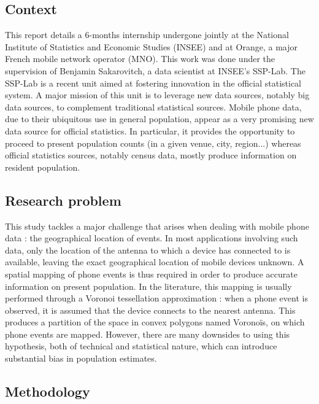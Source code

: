 

\subsection*{Context}

This report details a 6-months internship undergone jointly at the National Institute of Statistics and Economic Studies (INSEE) and at Orange, a major French mobile network operator (MNO). This work was done under the supervision of Benjamin Sakarovitch, a data scientist at INSEE's SSP-Lab. The SSP-Lab is a recent unit aimed at fostering innovation in the official statistical system. A major mission of this unit is to leverage new data sources, notably big data sources, to complement traditional statistical sources. Mobile phone data, due to their ubiquitous use in general population, appear as a very promising new data source for official statistics. In particular, it provides the opportunity to proceed to present population counts (in a given venue, city, region...) whereas official statistics sources, notably census data, mostly produce information on resident population.

\subsection*{Research problem}

This study tackles a major challenge that arises when dealing with mobile phone data : the geographical location of events. In most applications involving such data, only the location of the antenna to which a device has connected to is available, leaving the exact geographical location of mobile devices unknown. A spatial mapping of phone events is thus required in order to produce accurate information on present population. In the literature, this mapping is usually performed through a Voronoi tessellation approximation : when a phone event is observed, it is assumed that the device connects to the nearest antenna. This produces a partition of the space in convex polygons named Voronoïs, on which phone events are mapped. However, there are many downsides to using this hypothesis, both of technical and statistical nature, which can introduce substantial bias in population estimates.

\subsection*{Methodology}

